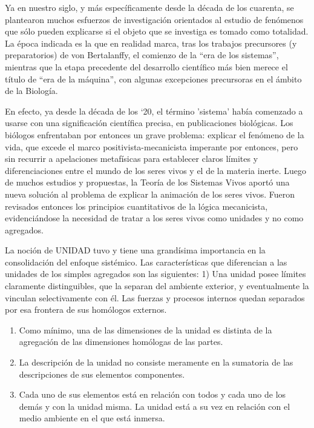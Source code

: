 \documentclass[
]{book}
\begin{document}
Ya en nuestro siglo, y más específicamente desde la década de los cuarenta, se plantearon muchos esfuerzos de investigación orientados al estudio de fenómenos que sólo pueden explicarse si el objeto que se investiga es tomado como totalidad. La época indicada es la que en realidad marca, tras los trabajos precursores (y preparatorios) de von Bertalanffy, el comienzo de la ``era de los sistemas'', mientras que la etapa precedente del desarrollo científico más bien merece el título de ``era de la máquina'', con algunas excepciones precursoras en el ámbito de la Biología.

En efecto, ya desde la década de los `20, el término 'sistema' había comenzado a usarse con una significación científica precisa, en publicaciones biológicas. Los biólogos enfrentaban por entonces un grave problema: explicar el fenómeno de la vida, que excede el marco positivista-mecanicista imperante por entonces, pero sin recurrir a apelaciones metafísicas para establecer claros límites y diferenciaciones entre el mundo de los seres vivos y el de la materia inerte. Luego de muchos estudios y propuestas, la Teoría de los Sistemas Vivos aportó una nueva solución al problema de explicar la animación de los seres vivos. Fueron revisados entonces los principios cuantitativos de la lógica mecanicista, evidenciándose la necesidad de tratar a los seres vivos como unidades y no como agregados.

La noción de UNIDAD tuvo y tiene una grandísima importancia en la consolidación del enfoque sistémico. Las características que diferencian a las unidades de los simples agregados son las siguientes: 1) Una unidad posee límites claramente distinguibles, que la separan del ambiente exterior, y eventualmente la vinculan selectivamente con él. Las fuerzas y procesos internos quedan separados por esa frontera de sus homólogos externos.

\begin{enumerate}
\def\labelenumi{\arabic{enumi})}
\setcounter{enumi}{1}
\item
  Como mínimo, una de las dimensiones de la unidad es distinta de la agregación de las dimensiones homólogas de las partes.
\item
  La descripción de la unidad no consiste meramente en la sumatoria de las descripciones de sus elementos componentes.
\item
  Cada uno de sus elementos está en relación con todos y cada uno de los demás y con la unidad misma. La unidad está a su vez en relación con el medio ambiente en el que está inmersa.
\end{enumerate}
\end{document}
